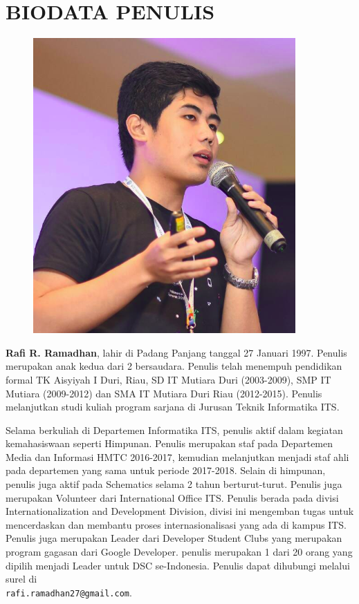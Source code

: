 \chapter{BIODATA PENULIS} 
\begin{figure} 
	\includegraphics[height=0.3\textheight]{biodata/rafi.png} 
\end{figure} 

\textbf{Rafi R. Ramadhan}, lahir di Padang Panjang tanggal 27 Januari 1997. Penulis merupakan anak kedua dari 2 bersaudara. Penulis telah menempuh pendidikan formal TK Aisyiyah I Duri, Riau, SD IT Mutiara Duri (2003-2009), SMP IT Mutiara (2009-2012) dan SMA IT Mutiara Duri Riau (2012-2015). Penulis melanjutkan studi kuliah program sarjana di Jurusan Teknik Informatika ITS. 

Selama berkuliah di Departemen Informatika ITS, penulis aktif dalam kegiatan kemahasiswaan seperti Himpunan. Penulis merupakan staf pada Departemen Media dan Informasi HMTC 2016-2017, kemudian melanjutkan menjadi staf ahli pada departemen yang sama untuk periode 2017-2018. Selain di himpunan, penulis juga aktif pada Schematics selama 2 tahun berturut-turut. Penulis juga merupakan Volunteer dari International Office ITS. Penulis berada pada divisi Internationalization and Development Division, divisi ini mengemban tugas untuk mencerdaskan dan membantu proses internasionalisasi yang ada di kampus ITS. Penulis juga merupakan Leader dari Developer Student Clubs yang merupakan program gagasan dari Google Developer. penulis merupakan 1 dari 20 orang yang dipilih menjadi Leader untuk DSC se-Indonesia. Penulis dapat dihubungi melalui surel di \\ \texttt{rafi.ramadhan27@gmail.com}.